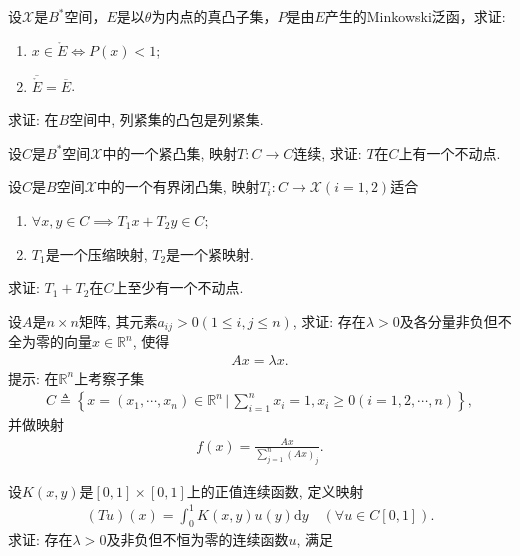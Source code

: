 \documentclass[../../main.tex]{subfiles}%
\begin{document}
\begin{proposition}\label{proposition:泛函分析--例题1.5.1}
设$\mathscr{X}$是$B^*$空间，$E$是以$\theta$为内点的真凸子集，$P$是由$E$产生的Minkowski泛函，求证:
\begin{enumerate}[(1)]
\item\label{proposition:泛函分析--例题1.5.1-1} $x \in \mathring{E} \iff P(x) < 1$;

\item\label{proposition:泛函分析--例题1.5.1-2} $\overline{\mathring{E}} = \overline{E}$.
\end{enumerate}
\end{proposition}

\begin{example}
求证: 在$B$空间中, 列紧集的凸包是列紧集.
\end{example}

\begin{example}
设$C$是$B^*$空间$\mathscr{X}$中的一个紧凸集, 映射$T: C \to C$连续, 求证: $T$在$C$上有一个不动点.
\end{example}

\begin{example}
设$C$是$B$空间$\mathscr{X}$中的一个有界闭凸集, 映射$T_i: C \to \mathscr{X}(i=1,2)$适合
\begin{enumerate}[(1)]
\item $\forall x,y \in C \implies T_1x + T_2y \in C$;
\item $T_1$是一个压缩映射, $T_2$是一个紧映射.
\end{enumerate}
求证: $T_1 + T_2$在$C$上至少有一个不动点.
\end{example}

\begin{example}
设$A$是$n \times n$矩阵, 其元素$a_{ij} > 0(1 \leqslant i,j \leqslant n)$, 求证: 存在$\lambda > 0$及各分量非负但不全为零的向量$x \in \mathbb{R}^n$, 使得
\begin{align*}
Ax = \lambda x.
\end{align*}
提示: 在$\mathbb{R}^n$上考察子集
\begin{align*}
C \triangleq \left\{ x = (x_1, \cdots, x_n) \in \mathbb{R}^n \,\bigg|\, \sum\limits_{i=1}^n x_i = 1, x_i \geqslant 0(i=1,2,\cdots,n) \right\},
\end{align*}
并做映射
\begin{align*}
f(x) = \frac{Ax}{\sum\limits_{j=1}^n (Ax)_j}.
\end{align*}
\end{example}

\begin{example}
设$K(x,y)$是$[0,1] \times [0,1]$上的正值连续函数, 定义映射
\begin{align*}
(Tu)(x) = \int_{0}^{1} K(x,y) u(y) \mathrm{d}y \quad (\forall u \in C[0,1]).
\end{align*}
求证: 存在$\lambda > 0$及非负但不恒为零的连续函数$u$, 满足
\end{example}
\end{document}
